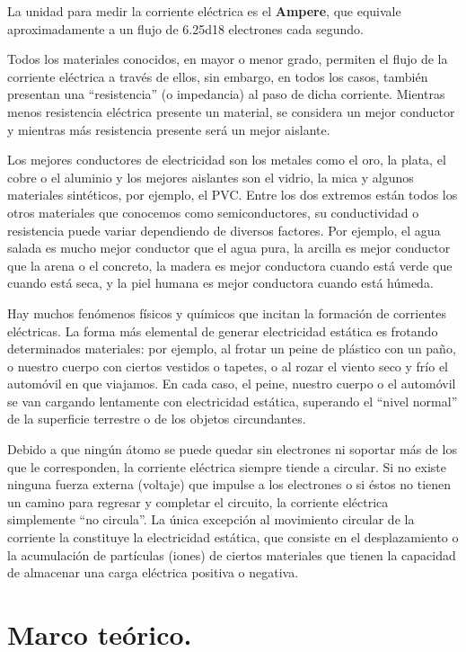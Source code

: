 \documentclass[14pt]{extarticle}
\begin{document}
La unidad para medir la corriente eléctrica es el \textbf{Ampere}, que equivale aproximadamente a un flujo de \num{6.25d18} electrones cada segundo.

Todos los materiales conocidos, en mayor o menor grado, permiten el flujo de la corriente eléctrica a través de ellos, sin embargo, en todos los casos, también presentan una \enquote{resistencia} (o impedancia) al paso de dicha corriente. Mientras menos resistencia eléctrica presente un material, se considera un mejor conductor y mientras más resistencia presente será un mejor aislante.

Los mejores conductores de electricidad son los metales como el oro, la plata, el cobre o el aluminio y los mejores aislantes son el vidrio, la mica y algunos materiales sintéticos, por ejemplo, el PVC. Entre los dos extremos están todos los otros materiales que conocemos como semiconductores, su conductividad o resistencia puede variar dependiendo de diversos factores. Por ejemplo, el agua salada es mucho mejor conductor que el agua pura, la arcilla es mejor conductor que la arena o el concreto, la madera es mejor conductora cuando está verde que cuando está seca, y la piel humana es mejor conductora cuando está húmeda.

Hay muchos fenómenos físicos y químicos que incitan la formación de corrientes eléctricas. La forma más elemental de generar electricidad estática es frotando determinados materiales: por ejemplo, al frotar un peine de plástico con un paño, o nuestro cuerpo con ciertos vestidos o tapetes, o al rozar el viento seco y frío el automóvil en que viajamos. En cada caso, el peine, nuestro cuerpo o el automóvil se van cargando lentamente con electricidad estática, superando el \enquote{nivel normal} de la superficie terrestre o de los objetos circundantes.

Debido a que ningún átomo se puede quedar sin electrones ni soportar más de los que le corresponden, la corriente eléctrica siempre tiende a circular. Si no existe ninguna fuerza externa (voltaje) que impulse a los electrones o si éstos no tienen un camino para regresar y completar el circuito, la corriente eléctrica simplemente \enquote{no circula}. La única excepción al movimiento circular de la corriente la constituye la electricidad estática, que consiste en el desplazamiento o la acumulación de partículas (iones) de ciertos materiales que tienen la capacidad de almacenar una carga eléctrica positiva o negativa.

\section{Marco teórico.}
\end{document}
